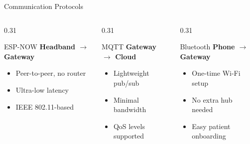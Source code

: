 \documentclass[aspectratio=169,10pt]{beamer}
\begin{document}
\begin{frame}{Communication Protocols}
  \vspace{0.3em}
  \begin{columns}[T]
    \begin{column}{0.31\textwidth}
      \begin{alertblock}{\faBroadcastTower\enspace ESP-NOW}
        \textbf{Headband $\to$ Gateway}\\[0.5em]
        \begin{itemize}\setlength\itemsep{0.4em}
          \item Peer-to-peer, no router
          \item Ultra-low latency
          \item IEEE 802.11-based
        \end{itemize}
      \end{alertblock}
    \end{column}
    \begin{column}{0.31\textwidth}
      \begin{alertblock}{\faCloud\enspace MQTT}
        \textbf{Gateway $\to$ Cloud}\\[0.5em]
        \begin{itemize}\setlength\itemsep{0.4em}
          \item Lightweight pub/sub
          \item Minimal bandwidth
          \item QoS levels supported
        \end{itemize}
      \end{alertblock}
    \end{column}
    \begin{column}{0.31\textwidth}
      \begin{alertblock}{\faBluetoothB\enspace Bluetooth}
        \textbf{Phone $\to$ Gateway}\\[0.5em]
        \begin{itemize}\setlength\itemsep{0.4em}
          \item One-time Wi-Fi setup
          \item No extra hub needed
          \item Easy patient onboarding
        \end{itemize}
      \end{alertblock}
    \end{column}
  \end{columns}
\end{frame}
\end{document}
